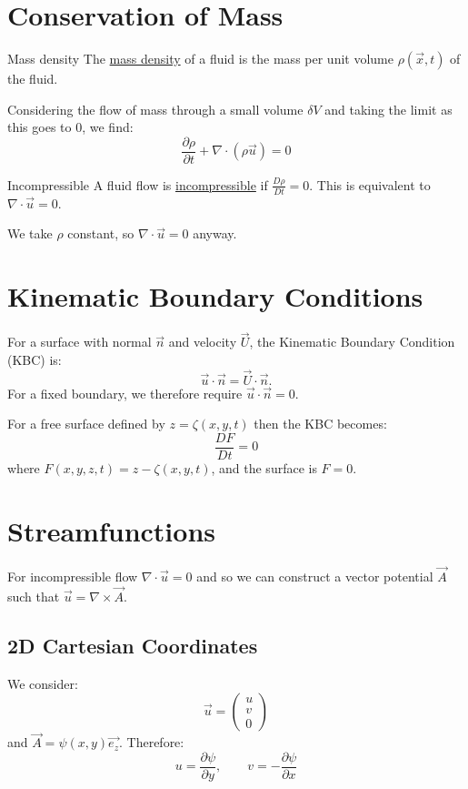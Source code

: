 \documentclass[../Main.tex]{subfiles}
\begin{document}
\section{Conservation of Mass}
\begin{definition}{Mass density}
    The \underline{mass density} of a fluid is the mass per unit volume $\rho(\vec{x}, t)$ of the fluid.
\end{definition}
Considering the flow of mass through a small volume $\delta V$ and taking the limit as this goes to $0$, we find:
\begin{equation}
    \frac{\partial \rho}{\partial t} + \nabla \cdot (\rho\vec{u}) = 0
    \label{eqnConserveMass}
\end{equation}
\begin{definition}{Incompressible}
    A fluid flow is \underline{incompressible} if $\frac{D \rho}{D t} = 0$. This is equivalent to $\nabla \cdot \vec{u} = 0$.
\end{definition}
We take $\rho$ constant, so $\nabla \cdot \vec{u} = 0$ anyway.
\section{Kinematic Boundary Conditions}
For a surface with normal $\vec{n}$ and velocity $\vec{U}$, the Kinematic Boundary Condition (KBC) is:
\begin{equation}
    \vec{u} \cdot \vec{n} = \vec{U} \cdot \vec{n}.
    \label{eqnKBC}
\end{equation}
For a fixed boundary, we therefore require $\vec{u} \cdot \vec{n} = 0$.

For a free surface defined by $z = \zeta(x, y, t)$ then the KBC becomes:
\begin{equation*}
    \frac{D F}{D t} = 0
\end{equation*}
where $F(x, y, z, t) = z - \zeta(x, y, t)$, and the surface is $F = 0$.
\section{Streamfunctions}
For incompressible flow $\nabla \cdot \vec{u} = 0$ and so we can construct a vector potential $\vec{A}$ such that $\vec{u} = \nabla \times \vec{A}$.
\subsection{2D Cartesian Coordinates}
We consider:
\begin{equation*}
    \vec{u} =
    \begin{pmatrix}u \\ v \\ 0\end{pmatrix}
\end{equation*}
and $\vec{A} = \psi(x, y) \vec{e_z}$. Therefore:
\begin{equation*}
    u = \frac{\partial \psi}{\partial y},\qquad v = -\frac{\partial \psi}{\partial x}
\end{equation*}
\end{document}
